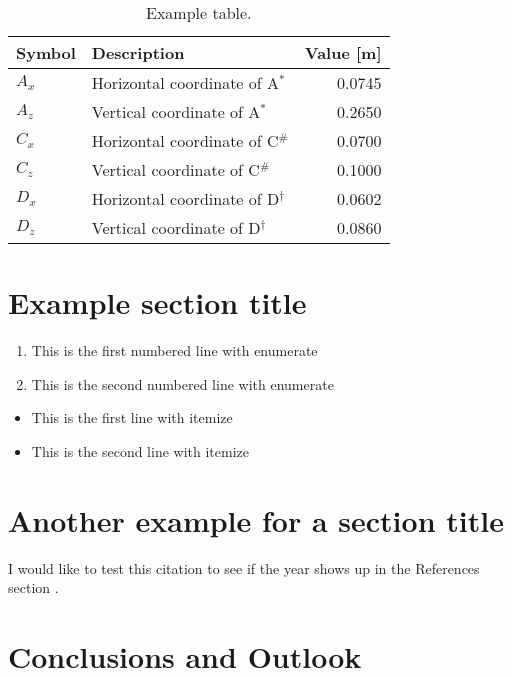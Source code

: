 \documentclass[a4paper, 10pt, journal]{KIT-HCR-Report-IEEE}      %
\begin{document}
\begin{table}[h]
\caption{Example table.}
   \begin{tabularx}{0.48\textwidth}{llr}
   		 \toprule 
   		 Symbol & \multicolumn{1}{X}{Description} & Value [m] \\
		 \midrule
		  $A_x$ & Horizontal coordinate of A$^{*}$ & 0.0745 \\
		  $A_z$ & Vertical coordinate of A$^{*}$ & 0.2650 \\  \noalign{\smallskip}
		  
		  $C_x$ & Horizontal coordinate of C$^{\#}$ & 0.0700 \\
		  $C_z$ & Vertical coordinate of C$^{\#}$ & 0.1000 \\
		  $D_x$ & Horizontal coordinate of D$^{\dag}$ & 0.0602 \\
		  $D_z$ & Vertical coordinate of D$^{\dag}$ & 0.0860 \\
		 \bottomrule
   \end{tabularx}  \label{tab:initmodel}
\end{table}



\section{Example section title}
\lipsum[1]

\begin{enumerate}
    \item This is the first numbered line with enumerate
    \item This is the second numbered line with enumerate
\end{enumerate}

\begin{itemize}
    \item This is the first line with itemize
    \item This is the second line with itemize
\end{itemize}

\section{Another example for a section title}

I would like to test this citation to see if the year shows up in the References section \cite{test}.

\lipsum[2]





\section{Conclusions and Outlook}

\lipsum[2]

% 

\end{document}
